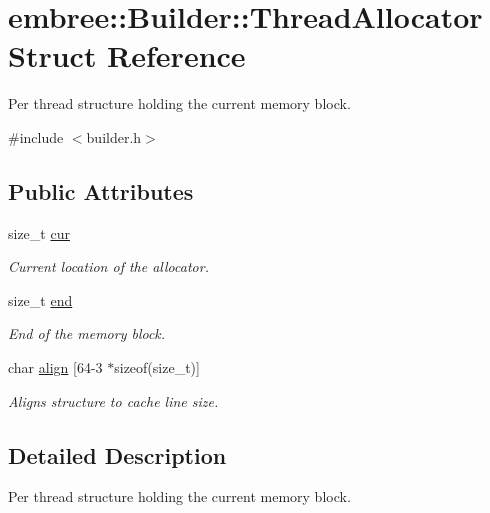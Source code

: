 \hypertarget{structembree_1_1_builder_1_1_thread_allocator}{
\section{embree::Builder::ThreadAllocator Struct Reference}
\label{structembree_1_1_builder_1_1_thread_allocator}
}


Per thread structure holding the current memory block.  




{\ttfamily \#include $<$builder.h$>$}

\subsection*{Public Attributes}
\begin{DoxyCompactItemize}
\item 
size\_\-t \hyperlink{structembree_1_1_builder_1_1_thread_allocator_abb22b1418877f34397ba8dedd4c3ce70}{cur}
\begin{DoxyCompactList}\small\item\em Current location of the allocator. \item\end{DoxyCompactList}\item 
size\_\-t \hyperlink{structembree_1_1_builder_1_1_thread_allocator_a88f9641d7ce77a79cacca61799318f6a}{end}
\begin{DoxyCompactList}\small\item\em End of the memory block. \item\end{DoxyCompactList}\item 
char \hyperlink{structembree_1_1_builder_1_1_thread_allocator_aac64ccddbecccfb0a5d20421b9974179}{align} \mbox{[}64-\/3 $\ast$sizeof(size\_\-t)\mbox{]}
\begin{DoxyCompactList}\small\item\em Aligns structure to cache line size. \item\end{DoxyCompactList}\end{DoxyCompactItemize}


\subsection{Detailed Description}
Per thread structure holding the current memory block. 

